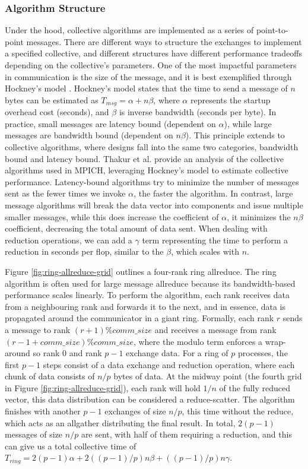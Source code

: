 \subsubsection{Algorithm Structure}\label{sec:CH2-MPI-AlgStructure}
Under the hood, collective algorithms are implemented as a series of point-to-point messages. 
There are different ways to structure the exchanges to implement a specified collective, and different structures have different performance tradeoffs depending on the collective's parameters.
One of the most impactful parameters in communication is the size of the message, and it is best exemplified through Hockney's model \cite{Hockney1994HockenyModel}.
Hockney's model states that the time to send a message of $n$ bytes can be estimated as $T_{msg}=\alpha+n\beta$, where $\alpha$ represents the startup overhead cost (seconds), and $\beta$ is inverse bandwidth (seconds per byte).
In practice, small messages are latency bound (dependent on $\alpha$), while large messages are bandwidth bound (dependent on $n\beta$).
This principle extends to collective algorithms, where designs fall into the same two categories, bandwidth bound and latency bound.
Thakur et al. \cite{Thakur2005OptMPICH} provide an analysis of the collective algorithms used in MPICH, leveraging Hockney's model to estimate collective performance.
Latency-bound algorithms try to minimize the number of messages sent as the fewer times we invoke $\alpha$, the faster the algorithm. 
In contrast, large message algorithms will break the data vector into components and issue multiple smaller messages, while this does increase the coefficient of $\alpha$, it minimizes the $n\beta$ coefficient, decreasing the total amount of data sent.
When dealing with reduction operations, we can add a $\gamma$ term representing the time to perform a reduction in seconds per flop, similar to the $\beta$, which scales with $n$.


Figure \ref{fig:ring-allreduce-grid} outlines a four-rank ring allreduce.
The ring algorithm is often used for large message allreduce because its bandwidth-based performance scales linearly.
To perform the algorithm, each rank receives data from a neighbouring rank and forwards it to the next, and in essence, data is propagated around the communicator in a giant ring.
Formally, each rank $r$ sends a message to rank $(r+1) \% comm\_size$ and receives a message from rank $(r-1+comm\_size) \% comm\_size$, where the modulo term enforces a wrap-around so rank 0 and rank $p-1$ exchange data.
For a ring of $p$ processes, the first $p-1$ steps consist of a data exchange and reduction operation, where each chunk of data consists of $n/p$ bytes of data. 
At the midway point (the fourth grid in Figure \ref{fig:ring-allreduce-grid}), each rank will hold $1/n$ of the fully reduced vector, this data distribution can be considered a reduce-scatter.
The algorithm finishes with another $p-1$ exchanges of size $n/p$, this time without the reduce, which acts as an allgather distributing the final result.
In total, $2(p-1)$ messages of size $n/p$ are sent, with half of them requiring a reduction, and this can give us a total collective time of $T_{ring} = 2(p-1)\alpha + 2((p-1)/p)n\beta + ((p-1)/p)n\gamma$.

